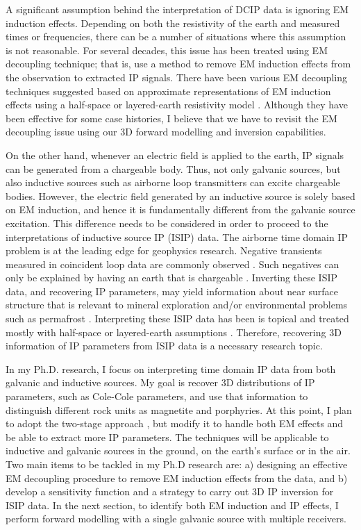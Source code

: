 \documentclass[letterpaper,11pt]{article}
\begin{document}
A significant assumption behind the interpretation of DCIP data is ignoring EM induction effects. Depending on both the resistivity of the earth and measured times or frequencies, there can be a number of situations where this assumption is not reasonable. For several decades, this issue has been treated using EM decoupling technique; that is, use a  method to remove EM induction effects from the observation to extracted IP signals. There have been various EM decoupling techniques suggested based on approximate representations of EM induction effects using a half-space or layered-earth resistivity model \cite[]{Wynn1975,routh2001}. Although they have been effective for some case histories, I believe that we have to revisit the EM decoupling issue using our 3D forward modelling and inversion capabilities.  

On the other hand, whenever an electric field is applied to the earth, IP signals can be generated from a chargeable body. Thus, not only galvanic sources, but also inductive sources such as airborne loop transmitters can excite chargeable bodies. However, the electric field generated by an inductive source is solely based on EM induction, and hence it is fundamentally different from the galvanic source excitation. This difference needs to be considered in order to proceed to the interpretations of inductive source IP (ISIP) data. The airborne time domain IP problem is at the leading edge for geophysics research. Negative transients measured in coincident loop data are commonly observed \cite[]{SmithandKlein,JansenEtAl2004,Kang2015b}. Such negatives can only be explained by having an earth that is chargeable \cite[]{Weidelt1982}. Inverting these ISIP data, and recovering IP parameters, may yield information about near surface structure that is relevant to mineral exploration and/or environmental problems such as permafrost \cite[]{SmithandKlein, Kang2015b}. Interpreting these ISIP data has been is topical and treated mostly with half-space or layered-earth assumptions \cite[]{Kratzer2012}. Therefore, recovering 3D information of IP parameters from ISIP data is a necessary research topic. 

In my Ph.D. research, I focus on interpreting time domain IP data from both galvanic and inductive sources. My goal is recover  3D distributions of IP parameters, such as Cole-Cole parameters, and use that information to  distinguish different rock units  as magnetite and porphyries. 
At this point, I plan to  adopt the two-stage approach \cite[]{doug1994}, but modify it to handle both EM effects and be able to extract more IP parameters. The techniques will be applicable to inductive and galvanic sources in the ground, on the earth’s surface or in the air.  Two main items to be tackled in my Ph.D research are:  a) designing an effective EM decoupling procedure to remove EM induction effects from the data, and b) develop a sensitivity function and a strategy to carry out 3D IP inversion for ISIP data. In the next section, to identify both EM induction and IP effects, I perform forward modelling with a single galvanic source with multiple receivers. 
\end{document}
